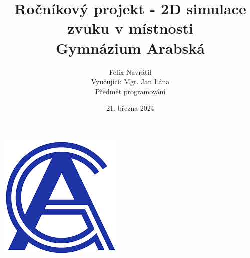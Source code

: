 \documentclass[12pt]{article}
\title{ Ročníkový projekt - 2D simulace zvuku v místnosti\\
        Gymnázium Arabská}
\author{Felix Navrátil\\
         Vyučující: Mgr. Jan Lána\\
        Předmět programování\\}
\date{21. března 2024}
\begin{document}
\maketitle
\begin{center}
    \includegraphics{Obrazky/GyArab (1).png}
\end{center}




\newpage


\newpage
\tableofcontents


\newpage


\newpage


\vspace{0.7cm}
\newpage



\newpage


\newpage
\listoffigures


\newpage
    
    
    \newpage
    
\end{document}
